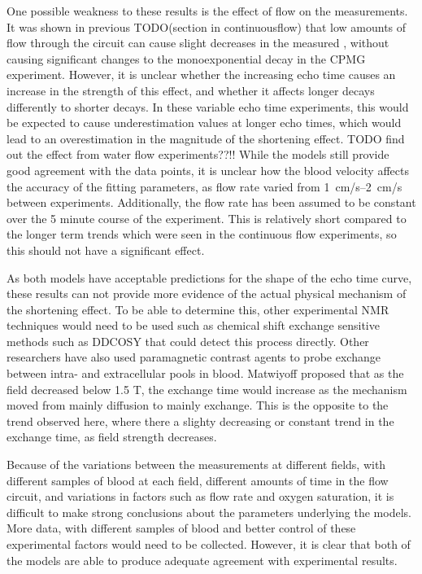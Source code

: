 One possible weakness to these results is the effect of flow on the \Ttwo measurements.
It was shown in previous TODO(section in continuousflow) that low amounts of flow through the circuit can cause slight decreases in the measured \Ttwo, without causing significant changes to the monoexponential decay in the CPMG experiment.
However, it is unclear whether the increasing echo time causes an increase in the strength of this effect, and whether it affects longer \Ttwo decays differently to shorter decays.
In these variable echo time experiments, this would be expected to cause underestimation \Ttwo values at longer echo times, which would lead to an overestimation in the magnitude of the \Ttwo shortening effect.
TODO find out the effect from water flow experiments??!!
While the models still provide good agreement with the data points, it is unclear how the blood velocity affects the accuracy of the fitting parameters, as flow rate varied from \SIrange{1}{2}{cm/s} between experiments.
Additionally, the flow rate has been assumed to be constant over the 5 minute course of the experiment.
This is relatively short compared to the longer term trends which were seen in the continuous flow experiments, so this should not have a significant effect.

As both models have acceptable predictions for the shape of the echo time curve, these results can not provide more evidence of the actual physical mechanism of the \Ttwo shortening effect.
To be able to determine this, other experimental NMR techniques would need to be used such as chemical shift exchange sensitive methods such as DDCOSY that could detect this process directly.
Other researchers have also used paramagnetic contrast agents to probe exchange between intra- and extracellular pools in blood\cite{LiIntegratedanalysisdiffusion1998}.
Matwiyoff \cite{Matwiyofflineshapeswater1990} proposed that as the field decreased below 1.5 T, the exchange time would increase as the mechanism moved from mainly diffusion to mainly exchange.
This is the opposite to the trend observed here, where there a slighty decreasing or constant trend in the exchange time, as field strength decreases.

Because of the variations between the measurements at different fields, with different samples of blood at each field, different amounts of time in the flow circuit, and variations in factors such as flow rate and oxygen saturation, it is difficult to make strong conclusions about the parameters underlying the models.
More data, with different samples of blood and better control of these experimental factors would need to be collected.
However, it is clear that both of the models are able to produce adequate agreement with experimental results.
